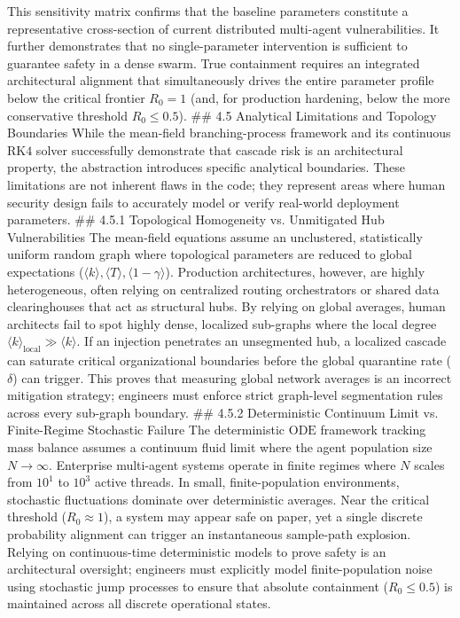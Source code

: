 This sensitivity matrix confirms that the baseline parameters constitute a representative cross-section of current distributed multi-agent vulnerabilities. It further demonstrates that no single-parameter intervention is sufficient to guarantee safety in a dense swarm. True containment requires an integrated architectural alignment that simultaneously drives the entire parameter profile below the critical frontier $R_0 = 1$ (and, for production hardening, below the more conservative threshold $R_0 \le 0.5$).
## 4.5 Analytical Limitations and Topology Boundaries
While the mean-field branching-process framework and its continuous $\text{RK}4$ solver successfully demonstrate that cascade risk is an architectural property, the abstraction introduces specific analytical boundaries. These limitations are not inherent flaws in the code; they represent areas where human security design fails to accurately model or verify real-world deployment parameters.
## 4.5.1 Topological Homogeneity vs. Unmitigated Hub Vulnerabilities
The mean-field equations assume an unclustered, statistically uniform random graph where topological parameters are reduced to global expectations ($\langle k \rangle, \langle T \rangle, \langle 1 - \gamma \rangle$). Production architectures, however, are highly heterogeneous, often relying on centralized routing orchestrators or shared data clearinghouses that act as structural hubs.
By relying on global averages, human architects fail to spot highly dense, localized sub-graphs where the local degree $\langle k \rangle_{\text{local}} \gg \langle k \rangle$. If an injection penetrates an unsegmented hub, a localized cascade can saturate critical organizational boundaries before the global quarantine rate ($\delta$) can trigger. This proves that measuring global network averages is an incorrect mitigation strategy; engineers must enforce strict graph-level segmentation rules across every sub-graph boundary.
## 4.5.2 Deterministic Continuum Limit vs. Finite-Regime Stochastic Failure
The deterministic $\text{ODE}$ framework tracking mass balance assumes a continuum fluid limit where the agent population size $N \to \infty$. Enterprise multi-agent systems operate in finite regimes where $N$ scales from $10^1$ to $10^3$ active threads.
In small, finite-population environments, stochastic fluctuations dominate over deterministic averages. Near the critical threshold ($R_0 \approx 1$), a system may appear safe on paper, yet a single discrete probability alignment can trigger an instantaneous sample-path explosion. Relying on continuous-time deterministic models to prove safety is an architectural oversight; engineers must explicitly model finite-population noise using stochastic jump processes to ensure that absolute containment ($R_0 \le 0.5$) is maintained across all discrete operational states.
